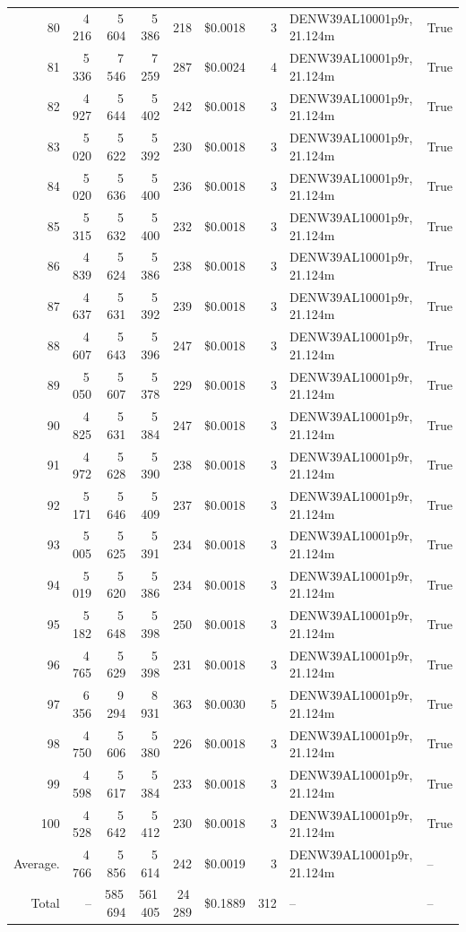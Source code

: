 \documentclass[a4paper,11pt]{article}
\begin{document}
\begin{table}[ht]
\begin{tabular}{r r r r r r r p{3cm} l}
80 & 4\,216 & 5\,604 & 5\,386 & 218 & \$0.0018 & 3 & DENW39AL10001p9r, 21.124m & True \\
81 & 5\,336 & 7\,546 & 7\,259 & 287 & \$0.0024 & 4 & DENW39AL10001p9r, 21.124m & True \\
82 & 4\,927 & 5\,644 & 5\,402 & 242 & \$0.0018 & 3 & DENW39AL10001p9r, 21.124m & True \\
83 & 5\,020 & 5\,622 & 5\,392 & 230 & \$0.0018 & 3 & DENW39AL10001p9r, 21.124m & True \\
84 & 5\,020 & 5\,636 & 5\,400 & 236 & \$0.0018 & 3 & DENW39AL10001p9r, 21.124m & True \\
85 & 5\,315 & 5\,632 & 5\,400 & 232 & \$0.0018 & 3 & DENW39AL10001p9r, 21.124m & True \\
86 & 4\,839 & 5\,624 & 5\,386 & 238 & \$0.0018 & 3 & DENW39AL10001p9r, 21.124m & True \\
87 & 4\,637 & 5\,631 & 5\,392 & 239 & \$0.0018 & 3 & DENW39AL10001p9r, 21.124m & True \\
88 & 4\,607 & 5\,643 & 5\,396 & 247 & \$0.0018 & 3 & DENW39AL10001p9r, 21.124m & True \\
89 & 5\,050 & 5\,607 & 5\,378 & 229 & \$0.0018 & 3 & DENW39AL10001p9r, 21.124m & True \\
90 & 4\,825 & 5\,631 & 5\,384 & 247 & \$0.0018 & 3 & DENW39AL10001p9r, 21.124m & True \\
91 & 4\,972 & 5\,628 & 5\,390 & 238 & \$0.0018 & 3 & DENW39AL10001p9r, 21.124m & True \\
92 & 5\,171 & 5\,646 & 5\,409 & 237 & \$0.0018 & 3 & DENW39AL10001p9r, 21.124m & True \\
93 & 5\,005 & 5\,625 & 5\,391 & 234 & \$0.0018 & 3 & DENW39AL10001p9r, 21.124m & True \\
94 & 5\,019 & 5\,620 & 5\,386 & 234 & \$0.0018 & 3 & DENW39AL10001p9r, 21.124m & True \\
95 & 5\,182 & 5\,648 & 5\,398 & 250 & \$0.0018 & 3 & DENW39AL10001p9r, 21.124m & True \\
96 & 4\,765 & 5\,629 & 5\,398 & 231 & \$0.0018 & 3 & DENW39AL10001p9r, 21.124m & True \\
97 & 6\,356 & 9\,294 & 8\,931 & 363 & \$0.0030 & 5 & DENW39AL10001p9r, 21.124m & True \\
98 & 4\,750 & 5\,606 & 5\,380 & 226 & \$0.0018 & 3 & DENW39AL10001p9r, 21.124m & True \\
99 & 4\,598 & 5\,617 & 5\,384 & 233 & \$0.0018 & 3 & DENW39AL10001p9r, 21.124m & True \\
100 & 4\,528 & 5\,642 & 5\,412 & 230 & \$0.0018 & 3 & DENW39AL10001p9r, 21.124m & True \\
\hline
Average. & 4\,766 & 5\,856 & 5\,614 & 242 & \$0.0019 & 3 & DENW39AL10001p9r, 21.124m & -- \\
Total & -- & 585\,694 & 561\,405 & 24\,289 & \$0.1889 & 312 & -- & -- \\
\hline
\end{tabular}
\end{table}
\end{document}
